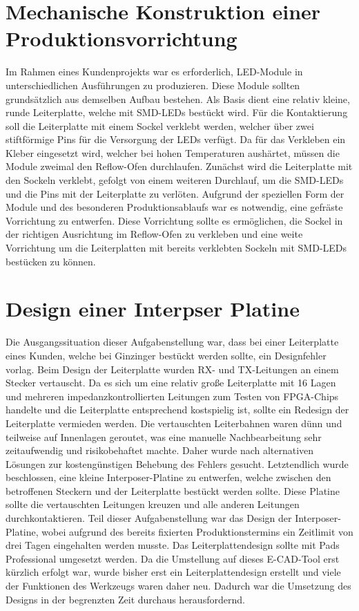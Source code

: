 \documentclass[praktikum,german]{hgbthesis}
\begin{document}
\section{Mechanische Konstruktion einer Produktionsvorrichtung}
Im Rahmen eines Kundenprojekts war es erforderlich, LED-Module in unterschiedlichen Ausführungen zu produzieren. Diese Module sollten grundsätzlich aus demselben Aufbau bestehen. Als Basis dient eine relativ kleine, runde Leiterplatte, welche mit SMD-LEDs bestückt wird. Für die Kontaktierung soll die Leiterplatte mit einem Sockel verklebt werden, welcher über zwei stiftförmige Pins für die Versorgung der LEDs verfügt. Da für das Verkleben ein Kleber eingesetzt wird, welcher bei hohen Temperaturen aushärtet, müssen die Module zweimal den Reflow-Ofen durchlaufen. Zunächst wird die Leiterplatte mit den Sockeln verklebt, gefolgt von einem weiteren Durchlauf, um die SMD-LEDs und die Pins mit der Leiterplatte zu verlöten. Aufgrund der speziellen Form der Module und des besonderen Produktionsablaufs war es notwendig, eine gefräste Vorrichtung zu entwerfen. Diese Vorrichtung sollte es ermöglichen, die Sockel in der richtigen Ausrichtung im Reflow-Ofen zu verkleben und eine weite Vorrichtung um die Leiterplatten mit bereits verklebten Sockeln mit SMD-LEDs bestücken zu können.

\section{Design einer Interpser Platine}
Die Ausgangssituation dieser Aufgabenstellung war, dass bei einer Leiterplatte eines Kunden, welche bei Ginzinger bestückt werden sollte, ein Designfehler vorlag. Beim Design der Leiterplatte wurden RX- und TX-Leitungen an einem Stecker vertauscht. Da es sich um eine relativ große Leiterplatte mit 16 Lagen und mehreren impedanzkontrollierten Leitungen zum Testen von FPGA-Chips handelte und die Leiterplatte entsprechend kostspielig ist, sollte ein Redesign der Leiterplatte vermieden werden. Die vertauschten Leiterbahnen waren dünn und teilweise auf Innenlagen geroutet, was eine manuelle Nachbearbeitung sehr zeitaufwendig und risikobehaftet machte. Daher wurde nach alternativen Lösungen zur kostengünstigen Behebung des Fehlers gesucht. Letztendlich wurde beschlossen, eine kleine Interposer-Platine zu entwerfen, welche zwischen den betroffenen Steckern und der Leiterplatte bestückt werden sollte. Diese Platine sollte die vertauschten Leitungen kreuzen und alle anderen Leitungen durchkontaktieren. Teil dieser Aufgabenstellung war das Design der Interposer-Platine, wobei aufgrund des bereits fixierten Produktionstermins ein Zeitlimit von drei Tagen eingehalten werden musste. Das Leiterplattendesign sollte mit Pads Professional umgesetzt werden. Da die Umstellung auf dieses E-CAD-Tool erst kürzlich erfolgt war, wurde bisher erst ein Leiterplattendesign erstellt und viele der Funktionen des Werkzeugs waren daher neu. Dadurch war die Umsetzung des Designs in der begrenzten Zeit durchaus herausfordernd. 
\end{document}
